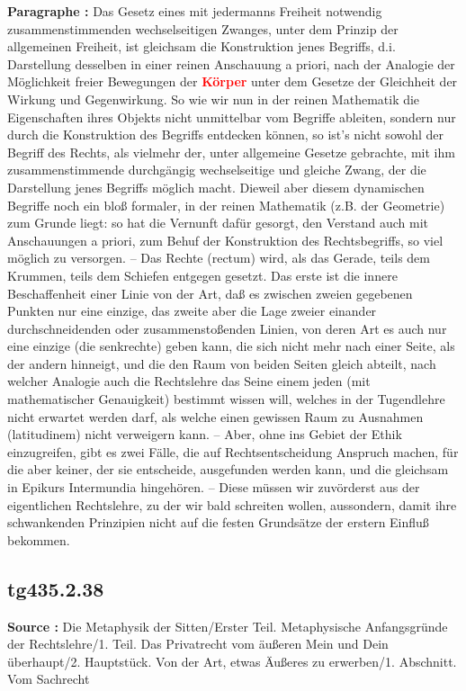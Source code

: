 \documentclass[a4paper,12pt,twoside]{book}
\newcommand{\match}[1]{\textcolor{red}{\textbf{#1}}}
\begin{document}
	\textbf{Paragraphe : }Das Gesetz eines mit jedermanns Freiheit notwendig zusammenstimmenden wechselseitigen Zwanges, unter dem Prinzip der allgemeinen Freiheit, ist gleichsam die Konstruktion jenes Begriffs, d.i. Darstellung desselben in einer reinen Anschauung a priori, nach der Analogie der Möglichkeit freier Bewegungen der \match{Körper} unter dem Gesetze der Gleichheit der Wirkung und Gegenwirkung. So wie wir nun in der reinen Mathematik die Eigenschaften ihres Objekts nicht unmittelbar vom Begriffe ableiten, sondern nur durch die Konstruktion des Begriffs entdecken können, so ist's nicht sowohl der Begriff des Rechts, als vielmehr der, unter allgemeine Gesetze gebrachte, mit ihm zusammenstimmende durchgängig wechselseitige und gleiche Zwang, der die Darstellung jenes Begriffs möglich macht. Dieweil aber diesem dynamischen Begriffe noch ein bloß formaler, in der reinen Mathematik (z.B. der Geometrie) zum Grunde liegt: so hat die Vernunft dafür gesorgt, den Verstand auch mit Anschauungen a priori, zum Behuf der Konstruktion des Rechtsbegriffs, so viel möglich zu versorgen. – Das Rechte (rectum) wird, als das Gerade, teils dem Krummen, teils dem Schiefen entgegen gesetzt. Das erste ist die innere Beschaffenheit einer Linie von der Art, daß es zwischen zweien gegebenen Punkten nur eine einzige, das zweite aber die Lage zweier einander durchschneidenden oder zusammenstoßenden Linien, von deren Art es auch nur eine einzige (die senkrechte) geben kann, die sich nicht mehr nach einer Seite, als der andern hinneigt, und die den Raum von beiden Seiten gleich abteilt, nach welcher Analogie auch die Rechtslehre das Seine einem jeden (mit mathematischer Genauigkeit) bestimmt wissen will, welches in der Tugendlehre nicht erwartet werden darf, als welche einen gewissen Raum zu Ausnahmen (latitudinem) nicht verweigern kann. – Aber, ohne ins Gebiet der Ethik einzugreifen, gibt es zwei Fälle, die auf Rechtsentscheidung  Anspruch machen, für die aber keiner, der sie entscheide, ausgefunden werden kann, und die gleichsam in Epikurs Intermundia hingehören. – Diese müssen wir zuvörderst aus der eigentlichen Rechtslehre, zu der wir bald schreiten wollen, aussondern, damit ihre schwankenden Prinzipien nicht auf die festen Grundsätze der erstern Einfluß bekommen. 
	
	\subsection*{tg435.2.38} 
	\textbf{Source : }Die Metaphysik der Sitten/Erster Teil. Metaphysische Anfangsgründe der Rechtslehre/1. Teil. Das Privatrecht vom äußeren Mein und Dein überhaupt/2. Hauptstück. Von der Art, etwas Äußeres zu erwerben/1. Abschnitt. Vom Sachrecht\\  
	
\end{document}
